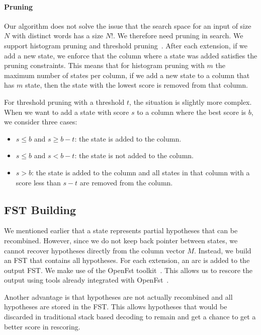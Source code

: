 \paragraph{Pruning}
Our algorithm does not solve the issue that the search space for an input
of size $N$ with distinct words has a size $N!$. We therefore need pruning
in search.
We support histogram pruning and threshold pruning~\citep{koehn:2010:book}.
After each extension, if we add a new state, we enforce that the column where
a state was added satisfies the pruning constraints. This means that for
histogram pruning with $m$ the maximum number of states per column, if we
add a new state to a column that has $m$ state, then the state with the lowest
score is removed from that column.

For threshold pruning with a threshold $t$, the situation is
slightly more complex. When we want to add a state with score $s$ to a column where the best score
is $b$, we consider three cases:
%
\begin{itemize}
  \item $s \leq b$ and $s \geq b - t$: the state is added to the column.
  \item $s \leq b$ and $s < b - t$: the state is not added to the column.
  \item $s > b$: the state is added to the column and all states in that
    column with a score less than $s - t$ are removed from the column.
\end{itemize}

\subsection{FST Building}

We mentioned earlier that a state represents partial hypotheses that can
be recombined. However, since we do not keep back pointer between states,
we cannot recover hypotheses directly from the column vector $M$.
Instead, we build an FST that contains all hypotheses. For each extension,
an arc is added to the output FST. We make use of the OpenFst
toolkit~\citep{allauzen-riley-schalkwyk-skut-mohri:2007:CIAA}.
This allows us to rescore the output using tools already integrated
with OpenFst~\citep{blackwood:2010:PHD}.

Another advantage is that hypotheses are not actually recombined
and all hypotheses are stored in the FST. This allows hypotheses
that would be discarded in traditional stack based decoding
to remain and get a chance to get a better score in rescoring.

